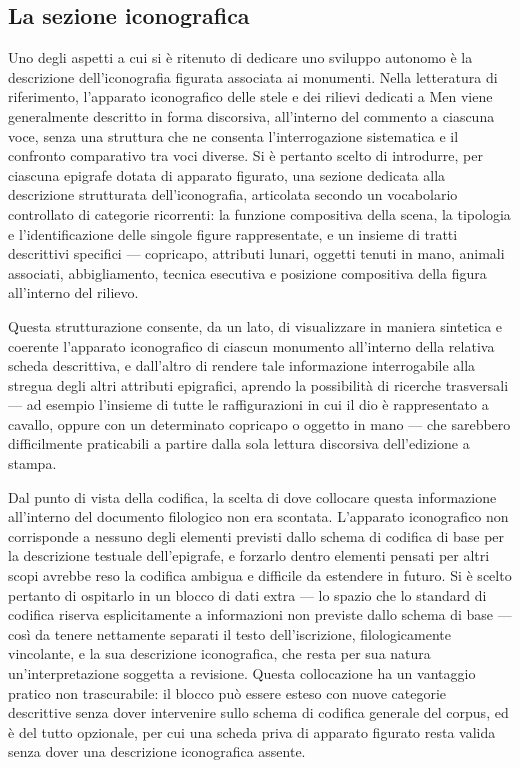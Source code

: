 \documentclass[11pt,a4paper]{article}
\begin{document}
\subsection{La sezione iconografica}

Uno degli aspetti a cui si è ritenuto di dedicare uno sviluppo autonomo
è la descrizione dell'iconografia figurata associata ai monumenti. Nella
letteratura di riferimento, l'apparato iconografico delle stele e dei
rilievi dedicati a Men viene generalmente descritto in forma discorsiva,
all'interno del commento a ciascuna voce, senza una struttura che ne
consenta l'interrogazione sistematica e il confronto comparativo tra
voci diverse. Si è pertanto scelto di introdurre, per ciascuna epigrafe
dotata di apparato figurato, una sezione dedicata alla descrizione
strutturata dell'iconografia, articolata secondo un vocabolario
controllato di categorie ricorrenti: la funzione compositiva della
scena, la tipologia e l'identificazione delle singole figure
rappresentate, e un insieme di tratti descrittivi specifici --- copricapo,
attributi lunari, oggetti tenuti in mano, animali associati, abbigliamento,
tecnica esecutiva e posizione compositiva della figura all'interno del
rilievo.

Questa strutturazione consente, da un lato, di visualizzare in maniera
sintetica e coerente l'apparato iconografico di ciascun monumento
all'interno della relativa scheda descrittiva, e dall'altro di rendere
tale informazione interrogabile alla stregua degli altri attributi
epigrafici, aprendo la possibilità di ricerche trasversali --- ad esempio
l'insieme di tutte le raffigurazioni in cui il dio è rappresentato a
cavallo, oppure con un determinato copricapo o oggetto in mano --- che
sarebbero difficilmente praticabili a partire dalla sola lettura
discorsiva dell'edizione a stampa.

Dal punto di vista della codifica, la scelta di dove collocare questa
informazione all'interno del documento filologico non era scontata.
L'apparato iconografico non corrisponde a nessuno degli elementi
previsti dallo schema di codifica di base per la descrizione testuale
dell'epigrafe, e forzarlo dentro elementi pensati per altri scopi
avrebbe reso la codifica ambigua e difficile da estendere in futuro. Si
è scelto pertanto di ospitarlo in un blocco di dati extra --- lo spazio
che lo standard di codifica riserva esplicitamente a informazioni non
previste dallo schema di base --- così da tenere nettamente separati il
testo dell'iscrizione, filologicamente vincolante, e la sua descrizione
iconografica, che resta per sua natura un'interpretazione soggetta a
revisione. Questa collocazione ha un vantaggio pratico non trascurabile:
il blocco può essere esteso con nuove categorie descrittive senza dover
intervenire sullo schema di codifica generale del corpus, ed è del tutto
opzionale, per cui una scheda priva di apparato figurato resta valida
senza dover  una descrizione iconografica assente.
\end{document}
